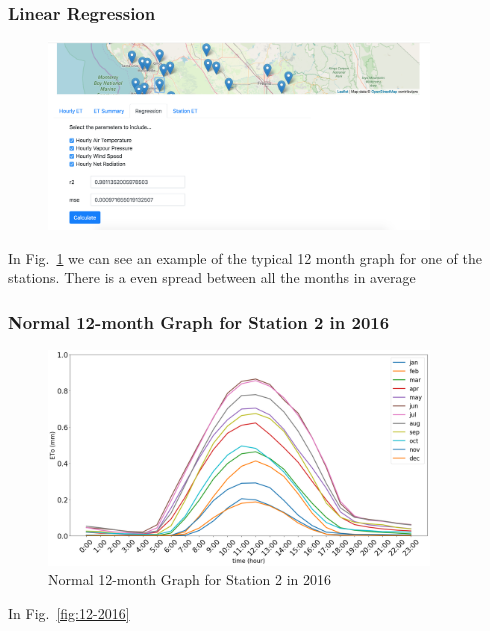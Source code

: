 \begin{frame}
	\frametitle{Linear Regression}
	\centering
	\begin{figure}
		\includegraphics[width=0.9\textwidth]{images/fig3.png}
	\end{figure}
\end{frame}

\begin{frame}
	In Fig.~\ref{fig:2-2016} we can see an example of the typical 12 month graph for one of the stations. There is a even spread between all the months in average
\end{frame}

\begin{frame}
\frametitle{Normal 12-month Graph for Station 2 in 2016}
\centering
\begin{figure}
	\includegraphics[width=0.9\textwidth]{images/2-2016.png}
	\caption{Normal 12-month Graph for Station 2 in 2016}\label{fig:2-2016}
\end{figure}
\end{frame}

\begin{frame}
	In Fig.~\ref{fig:12-2016} 
\end{frame}

